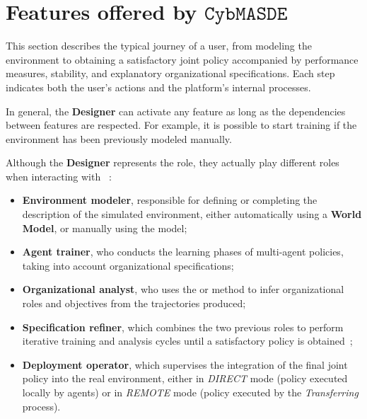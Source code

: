 \section{Features offered by $\texttt{CybMASDE}$}

This section describes the typical journey of a  user, from modeling the environment to obtaining a satisfactory joint policy accompanied by performance measures, stability, and explanatory organizational specifications. Each step indicates both the user's actions and the platform's internal processes.

In general, the \textbf{Designer} can activate any feature as long as the dependencies between features are respected.
For example, it is possible to start training if the environment has been previously modeled manually.


Although the \textbf{Designer} represents the  role, they actually play different roles when interacting with ~:
\begin{itemize}
  \item \textbf{Environment modeler}, responsible for defining or completing the description of the simulated environment, either automatically using a \textbf{World Model}, or manually using the  model;
  \item \textbf{Agent trainer}, who conducts the learning phases of multi-agent policies, taking into account organizational specifications;
  \item \textbf{Organizational analyst}, who uses the  or  method to infer organizational roles and objectives from the trajectories produced;
  \item \textbf{Specification refiner}, which combines the two previous roles to perform iterative training and analysis cycles until a satisfactory policy is obtained~;
  \item \textbf{Deployment operator}, which supervises the integration of the final joint policy into the real environment, either in \textit{DIRECT} mode (policy executed locally by agents) or in \textit{REMOTE} mode (policy executed by the \textit{Transferring} process).
\end{itemize}

